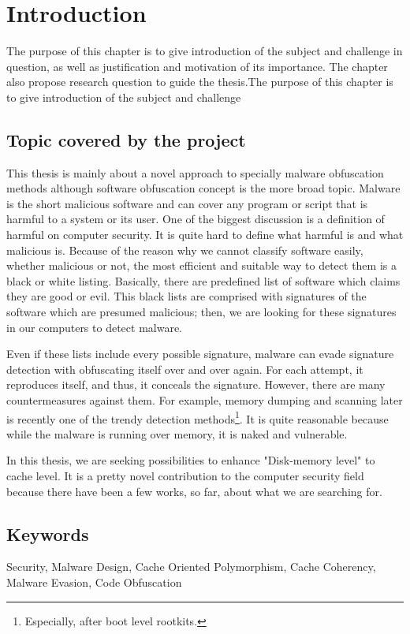 \chapter{Introduction}
The purpose of this chapter is to give introduction of the subject and challenge in question, as well as justification and motivation of its importance. The chapter also propose research question to guide the thesis.The purpose of this chapter is to give introduction of the subject and challenge

\section{Topic covered by the project}
This thesis is mainly about a novel approach to specially malware obfuscation methods although software obfuscation concept is the more broad topic. Malware is the short malicious software and can cover any program or script that is harmful to a system or its user. One of the biggest discussion is a definition of harmful on computer security. It is quite hard to define what harmful is and what malicious is. Because of the reason why we cannot classify software easily, whether malicious or not, the most efficient and suitable way to detect them is a black or white listing. Basically, there are predefined list of software which claims they are good or evil. This black lists are comprised with signatures of the software which are presumed malicious; then, we are looking for these signatures in our computers to detect malware. 

Even if these lists include every possible signature, malware can evade signature detection with obfuscating itself over and over again. For each attempt, it reproduces itself, and thus, it conceals the signature. However, there are many countermeasures against them\cite{moser2007limits}\cite{egele2012survey}. For example, memory dumping and scanning later is recently one of the trendy detection methods\footnote{Especially, after boot level rootkits.}. It is quite reasonable because while the malware is running over memory, it is naked and vulnerable.

In this thesis, we are seeking possibilities to enhance "Disk-memory level" to cache level. It is a pretty novel contribution to the computer security field because there have been a few works, so far, about what we are searching for.


\section{Keywords}
Security, Malware Design, Cache Oriented Polymorphism, Cache Coherency, Malware Evasion, Code Obfuscation

